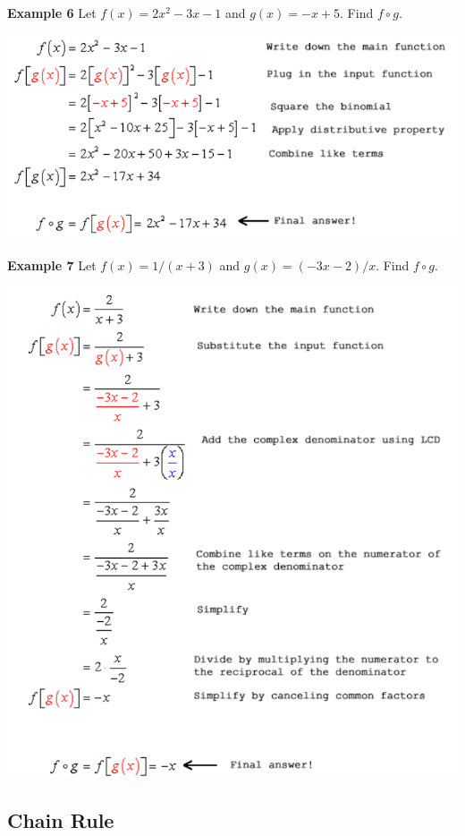 \documentclass[
]{book}
\begin{document}
\hfill\break

\textbf{Example 6} Let \(f(x) = 2x^2 - 3x -1\) and \(g(x) = -x + 5\). Find \(f\circ g\).

\begin{center}\includegraphics[width=0.75\linewidth]{img03/w03-CompositeFunEx01} \end{center}

\hfill\break

\textbf{Example 7} Let \(f(x) = 1/(x+3)\) and \(g(x) = (-3x-2)/x\). Find \(f\circ g\).

\begin{center}\includegraphics[width=0.8\linewidth]{img03/w03-CompositeFunEx02} \end{center}

\hfill\break

\hypertarget{chain-rule-1}{%
\subsection{Chain Rule}\label{chain-rule-1}}
\end{document}
